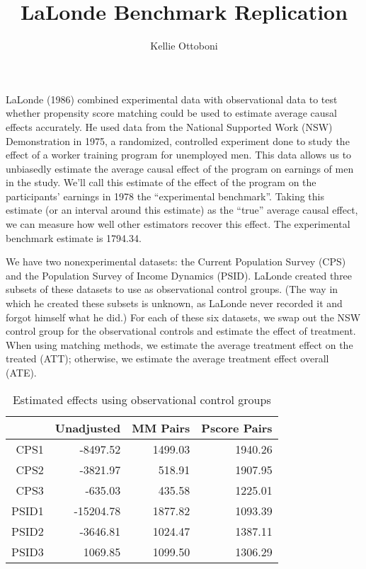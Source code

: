 \documentclass[11pt]{article}\usepackage[]{graphicx}\usepackage[]{color}
\title{LaLonde Benchmark Replication}
\author{Kellie Ottoboni}
\begin{document}
\maketitle







LaLonde (1986) combined experimental data with observational data to test whether propensity score matching could be used to estimate average causal effects accurately.
He used data from the National Supported Work (NSW) Demonstration in 1975, a randomized, controlled experiment done to study the effect of a worker training program for unemployed men.
This data allows us to unbiasedly estimate the average causal effect of the program on earnings of men in the study.
We'll call this estimate of the effect of the program on the participants' earnings in 1978 the ``experimental benchmark''.
Taking this estimate (or an interval around this estimate) as the ``true'' average causal effect, we can measure how well other estimators recover this effect.
The experimental benchmark estimate is 1794.34.

We have two nonexperimental datasets: the Current Population Survey (CPS) and the Population Survey of Income Dynamics (PSID).
LaLonde created three subsets of these datasets to use as observational control groups.
(The way in which he created these subsets is unknown, as LaLonde never recorded it and forgot himself what he did.)
For each of these six datasets, we swap out the NSW control group for the observational controls and estimate the effect of treatment.
When using matching methods, we estimate the average treatment effect on the treated (ATT); otherwise, we estimate the average treatment effect overall (ATE).














\begin{table}[ht]
\centering
\begin{tabular}{rrrr}
  \hline
 & Unadjusted & MM Pairs & Pscore Pairs \\ 
  \hline
CPS1 & -8497.52 & 1499.03 & 1940.26 \\ 
  CPS2 & -3821.97 & 518.91 & 1907.95 \\ 
  CPS3 & -635.03 & 435.58 & 1225.01 \\ 
  PSID1 & -15204.78 & 1877.82 & 1093.39 \\ 
  PSID2 & -3646.81 & 1024.47 & 1387.11 \\ 
  PSID3 & 1069.85 & 1099.50 & 1306.29 \\ 
   \hline
\end{tabular}
\caption{Estimated effects using observational control groups} 
\label{tab:results}
\end{table}
\end{document}
